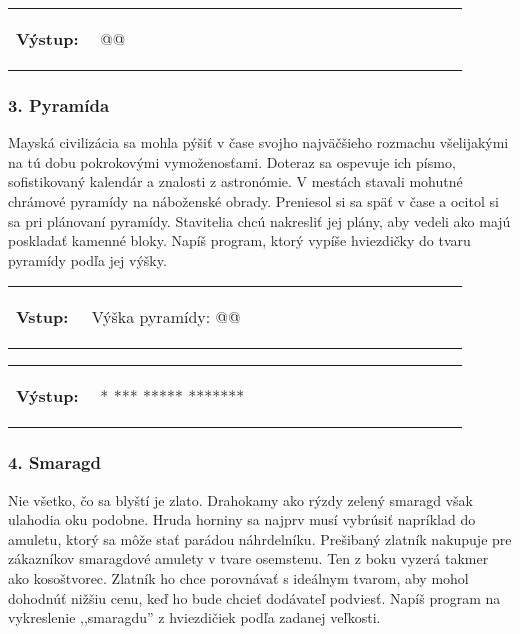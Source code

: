 \vspace{-2em}
\begin{tabular}{@{}p{0.15\linewidth}p{0.75\linewidth}}
\textbf{\small Výstup:} &
\vspace{-3em}
\begin{code}
@\fbox{\textit{*****}}@
\end{code}
\end{tabular}
\vspace{-2em}


\subsubsection*{3. Pyramída}
Mayská civilizácia sa mohla pýšiť v čase svojho najväčšieho rozmachu všelijakými na tú dobu pokrokovými vymoženosťami. Doteraz sa ospevuje ich písmo, sofistikovaný kalendár a znalosti z astronómie. V mestách stavali mohutné chrámové pyramídy na náboženské obrady. Preniesol si sa späť v čase a ocitol si sa pri plánovaní pyramídy. Stavitelia chcú nakresliť jej plány, aby vedeli ako majú poskladať kamenné bloky. Napíš program, ktorý vypíše hviezdičky do tvaru pyramídy podľa jej výšky.

\begin{tabular}{@{}p{0.15\linewidth}p{0.75\linewidth}}
\textbf{\small Vstup:} &
\vspace{-3em}
\begin{code}
Výška pyramídy: @\fbox{4}@
\end{code}
\end{tabular}

\vspace{-2em}
\begin{tabular}{@{}p{0.15\linewidth}p{0.75\linewidth}}
\textbf{\small Výstup:} &
\vspace{-3em}
\begin{code}
   *
  ***
 *****
*******
\end{code}
\end{tabular}
\vspace{-2em}


\subsubsection*{4. Smaragd}
Nie všetko, čo sa blyští je zlato. Drahokamy ako rýzdy zelený smaragd však ulahodia oku podobne. Hruda horniny sa najprv musí vybrúsiť napríklad do amuletu, ktorý sa môže stať parádou náhrdelníku. Prešibaný zlatník nakupuje pre zákazníkov smaragdové amulety v tvare osemstenu. Ten z boku vyzerá takmer ako kosoštvorec. Zlatník ho chce porovnávať s ideálnym tvarom, aby mohol dohodnúť nižšiu cenu, keď ho bude chcieť dodávateľ podviesť. Napíš program na vykreslenie ,,smaragdu'' z hviezdičiek podľa zadanej veľkosti.

